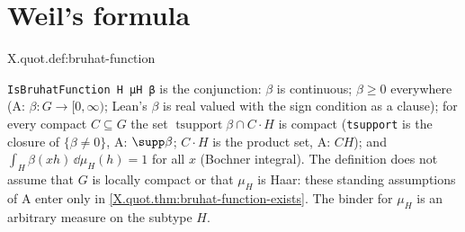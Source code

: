 \section{Weil's formula}
\begin{definition}
\end{definition}
\begin{tfformal}{X.quot.def:bruhat-function}
\begin{tffidelity}
\texttt{IsBruhatFunction H μH β} is the conjunction: $\beta$ is continuous; $\beta\ge0$ everywhere (A: $\beta\colon G\to[0,\infty)$; Lean's $\beta$ is real valued with the sign condition as a clause); for every compact $C\subseteq G$ the set $\operatorname{tsupport}\beta\cap C\cdot H$ is compact (\texttt{tsupport} is the closure of $\{\beta\ne0\}$, A: $\supp\beta$; $C\cdot H$ is the product set, A: $CH$); and $\int_H\beta(xh)\,\dd\mu_H(h)=1$ for all $x$ (Bochner integral). The definition does not assume that $G$ is locally compact or that $\mu_H$ is Haar: these standing assumptions of A enter only in \cref{X.quot.thm:bruhat-function-exists}. The binder for $\mu_H$ is an arbitrary measure on the subtype $H$.
\end{tffidelity}
\end{tfformal}

